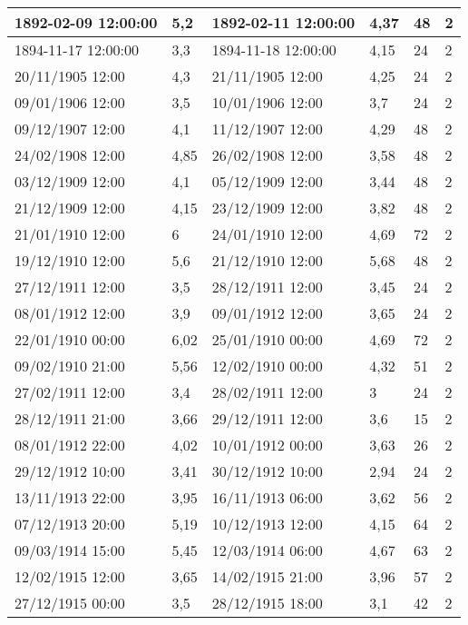 \documentclass[11pt]{article}
\begin{document}
\begin{longtable}{|l|p{2.3cm}|l|p{2.3cm}|l|l|}
        1892-02-09 12:00:00 & 5,2 & 1892-02-11 12:00:00 & 4,37 & 48 & 2 \\ \hline
        1894-11-17 12:00:00 & 3,3 & 1894-11-18 12:00:00 & 4,15 & 24 & 2 \\ \hline
        20/11/1905 12:00 & 4,3 & 21/11/1905 12:00 & 4,25 & 24 & 2 \\ \hline
        09/01/1906 12:00 & 3,5 & 10/01/1906 12:00 & 3,7 & 24 & 2 \\ \hline
        09/12/1907 12:00 & 4,1 & 11/12/1907 12:00 & 4,29 & 48 & 2 \\ \hline
        24/02/1908 12:00 & 4,85 & 26/02/1908 12:00 & 3,58 & 48 & 2 \\ \hline
        03/12/1909 12:00 & 4,1 & 05/12/1909 12:00 & 3,44 & 48 & 2 \\ \hline
        21/12/1909 12:00 & 4,15 & 23/12/1909 12:00 & 3,82 & 48 & 2 \\ \hline
        21/01/1910 12:00 & 6 & 24/01/1910 12:00 & 4,69 & 72 & 2 \\ \hline
        19/12/1910 12:00 & 5,6 & 21/12/1910 12:00 & 5,68 & 48 & 2 \\ \hline
        27/12/1911 12:00 & 3,5 & 28/12/1911 12:00 & 3,45 & 24 & 2 \\ \hline
        08/01/1912 12:00 & 3,9 & 09/01/1912 12:00 & 3,65 & 24 & 2 \\ \hline
        22/01/1910 00:00 & 6,02 & 25/01/1910 00:00 & 4,69 & 72 & 2 \\ \hline
        09/02/1910 21:00 & 5,56 & 12/02/1910 00:00 & 4,32 & 51 & 2 \\ \hline
        27/02/1911 12:00 & 3,4 & 28/02/1911 12:00 & 3 & 24 & 2 \\ \hline
        28/12/1911 21:00 & 3,66 & 29/12/1911 12:00 & 3,6 & 15 & 2 \\ \hline
        08/01/1912 22:00 & 4,02 & 10/01/1912 00:00 & 3,63 & 26 & 2 \\ \hline
        29/12/1912 10:00 & 3,41 & 30/12/1912 10:00 & 2,94 & 24 & 2 \\ \hline
        13/11/1913 22:00 & 3,95 & 16/11/1913 06:00 & 3,62 & 56 & 2 \\ \hline
        07/12/1913 20:00 & 5,19 & 10/12/1913 12:00 & 4,15 & 64 & 2 \\ \hline
        09/03/1914 15:00 & 5,45 & 12/03/1914 06:00 & 4,67 & 63 & 2 \\ \hline
        12/02/1915 12:00 & 3,65 & 14/02/1915 21:00 & 3,96 & 57 & 2 \\ \hline
        27/12/1915 00:00 & 3,5 & 28/12/1915 18:00 & 3,1 & 42 & 2 \\ \hline

\end{longtable}
\end{document}
